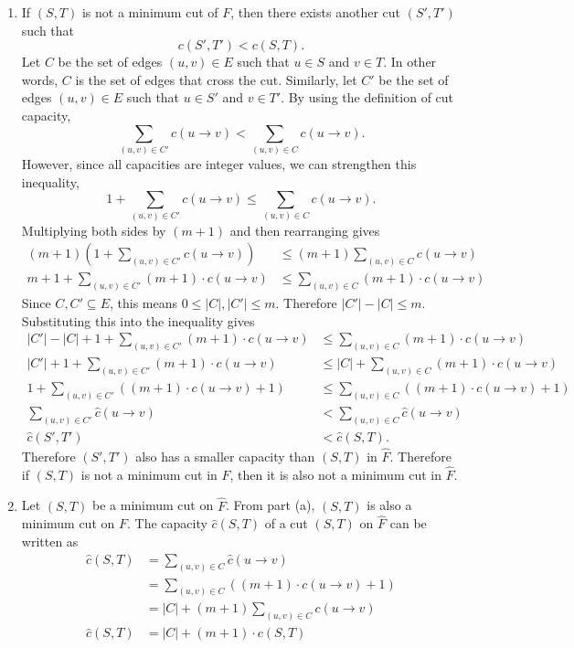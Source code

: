 \documentclass{article}
\begin{document}
\begin{solution}
\begin{enumerate}[label = (\alph*)]
    \item If $(S,T)$ is not a minimum cut of $F$, then there exists another cut $(S', T')$ such that
    $$c(S',T')<c(S,T).$$
    Let $C$ be the set of edges $(u,v)\in E$ such that $u\in S$ and $v\in T$. 
    In other words, $C$ is the set of edges that cross the cut.
    Similarly, let $C'$ be the set of edges $(u,v)\in E$ such that $u\in S'$ and $v\in T'$.
    By using the definition of cut capacity,
    $$\sum_{(u,v)\in C'} c(u\to v) < \sum_{(u,v)\in C} c(u\to v).$$
    However, since all capacities are integer values, we can strengthen this inequality,
    $$1+\sum_{(u,v)\in C'} c(u\to v) \leq \sum_{(u,v)\in C} c(u\to v).$$
    Multiplying both sides by $(m + 1)$ and then rearranging gives
    \begin{align*}
        (m+1)\left(1+\sum_{(u,v)\in C'} c(u\to v)\right) &\leq (m+1)\sum_{(u,v)\in C} c(u\to v)\\
        m+1+\sum_{(u,v)\in C'} (m+1)\cdot c(u\to v) &\leq \sum_{(u,v)\in C} (m+1)\cdot c(u\to v)
    \end{align*}
    Since $C, C'\subseteq E$, this means $0\leq|C|,|C'|\leq m$. Therefore $|C'|-|C|\leq m$.
    Substituting this into the inequality gives
    \begin{align*}
        |C'|-|C|+1+\sum_{(u,v)\in C'} (m+1)\cdot c(u\to v) &\leq \sum_{(u,v)\in C} (m+1)\cdot c(u\to v)\\
        |C'|+1+\sum_{(u,v)\in C'} (m+1)\cdot c(u\to v) &\leq |C|+\sum_{(u,v)\in C} (m+1)\cdot c(u\to v)\\
        1+\sum_{(u,v)\in C'} ((m+1)\cdot c(u\to v)+1) &\leq \sum_{(u,v)\in C} ((m+1)\cdot c(u\to v)+1)\\
        \sum_{(u,v)\in C'} \hat{c}(u\to v) &<\sum_{(u,v)\in C}\hat{c}(u\to v)\\
        \hat{c}(S',T')&<\hat{c}(S,T).
    \end{align*}
    Therefore $(S',T')$ also has a smaller capacity than $(S,T)$ in $\hat{F}$. Therefore if $(S,T)$ is not a minimum
    cut in $F$, then it is also not a minimum cut in $\hat{F}$.
    
    \item Let $(S,T)$ be a minimum cut on $\hat{F}$. From part (a), $(S,T)$ is also a minimum cut on $F$.
    The capacity $\hat{c}(S,T)$ of a cut $(S,T)$ on $\hat{F}$ can be written as
    \begin{align*}
        \hat{c}(S,T) &= \sum_{(u,v)\in C}\hat{c}(u\to v)\\
        &= \sum_{(u,v)\in C} ((m+1)\cdot c(u\to v)+1)\\
        &= |C| + (m+1)\sum_{(u,v)\in C}c(u\to v)\\
        \hat{c}(S,T) &= |C| + (m+1)\cdot c(S,T)
    \end{align*}


\end{enumerate}
\end{solution}
\end{document}
